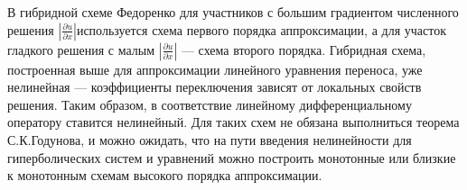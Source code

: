 \documentclass[12pt]{kiarticle} %
\begin{document}
	
	
	В гибридной схеме Федоренко для участников с большим градиентом численного решения $ |\frac{\partial u}{\partial x}| $используется схема первого порядка аппроксимации, а для участок гладкого решения с малым $| \frac{\partial u}{\partial x} | $ — схема второго порядка. Гибридная схема, построенная выше для аппроксимации линейного уравнения переноса, уже нелинейная — коэффициенты переключения зависят от локальных свойств решения. Таким образом, в соответствие линейному дифференциальному оператору ставится нелинейный. Для таких схем не обязана выполниться теорема С.К.Годунова, и можно ожидать, что на пути введения нелинейности для гиперболических систем и уравнений можно построить монотонные или близкие к монотонным схемам высокого порядка аппроксимации.
	
\end{document}
